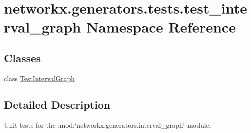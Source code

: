 \hypertarget{namespacenetworkx_1_1generators_1_1tests_1_1test__interval__graph}{}\section{networkx.\+generators.\+tests.\+test\+\_\+interval\+\_\+graph Namespace Reference}
\label{namespacenetworkx_1_1generators_1_1tests_1_1test__interval__graph}
\subsection*{Classes}
\begin{DoxyCompactItemize}
\item 
class \hyperlink{classnetworkx_1_1generators_1_1tests_1_1test__interval__graph_1_1TestIntervalGraph}{Test\+Interval\+Graph}
\end{DoxyCompactItemize}


\subsection{Detailed Description}
\begin{DoxyVerb}Unit tests for the :mod:`networkx.generators.interval_graph` module.\end{DoxyVerb}
 